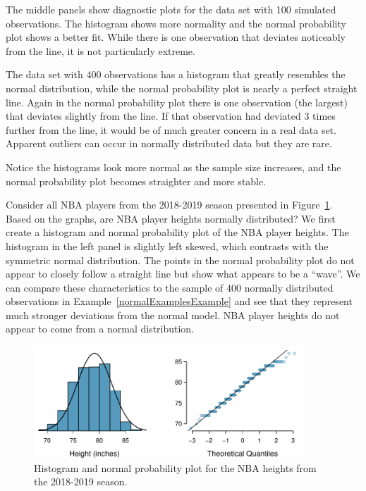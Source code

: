 The middle panels show diagnostic plots for the data set with 100 simulated observations. The histogram shows more normality and the normal probability plot shows a better fit. While there is one observation that deviates noticeably from the line, it is not particularly extreme.

The data set with 400 observations has a histogram that greatly resembles the normal distribution, while the normal probability plot is nearly a perfect straight line. Again in the normal probability plot there is one observation (the largest) that deviates slightly from the line. If that observation had deviated 3 times further from the line, it would be of much greater concern in a real data set. Apparent outliers can occur in normally distributed data but they are rare.

Notice the histograms look more normal as the sample size increases, and the normal probability plot becomes straighter and more stable.


\begin{examplewrap}
\begin{nexample}{Consider all NBA players from the 2018-2019 season presented in Figure~\ref{nbaNormal}.\footnotemark\,  Based on the graphs, are NBA player heights normally distributed? }
We first create a histogram and normal probability plot of the NBA player heights. The histogram in the left panel is slightly left skewed, which contrasts with the symmetric normal distribution. The points in the normal probability plot do not appear to closely follow a straight line but show what appears to be a ``wave''. We can compare these characteristics to the sample of 400 normally distributed observations in Example~\ref{normalExamplesExample} and see that they represent much stronger deviations from the normal model. NBA player heights do not appear to come from a normal distribution.
\end{nexample}
\end{examplewrap}

\begin{figure}
\centering
\includegraphics[width=0.9\textwidth]{ch_distributions/figures/nbaNormal/nbaNormal}
\caption{Histogram and normal probability plot for the NBA heights from the 2018-2019 season.}
\label{nbaNormal}
\end{figure}

